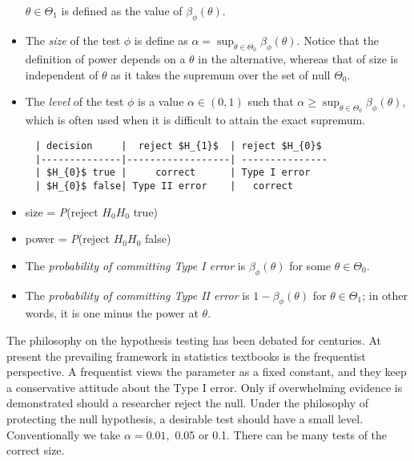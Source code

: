 \documentclass[11pt]{article}
\providecommand{\tightlist}{%
      \setlength{\itemsep}{0pt}\setlength{\parskip}{0pt}}
\begin{document}
\begin{itemize}
  \(\theta\in\Theta_{1}\) is defined as the value of
  \(\beta_{\phi}\left(\theta\right)\).
\item
  The \emph{size} of the test \(\phi\) is define as
  \(\alpha=\sup_{\theta\in\Theta_{0}}\beta_{\phi}\left(\theta\right).\)
  Notice that the definition of power depends on a \(\theta\) in the
  alternative, whereas that of size is independent of \(\theta\) as it
  takes the supremum over the set of null \(\Theta_0\).
\item
  The \emph{level} of the test \(\phi\) is a value
  \(\alpha\in\left(0,1\right)\) such that
  \(\alpha\geq\sup_{\theta\in\Theta_{0}}\beta_{\phi}\left(\theta\right)\),
  which is often used when it is difficult to attain the exact supremum.
\end{itemize}

    \begin{verbatim}
     | decision     |  reject $H_{1}$  | reject $H_{0}$
     |--------------|------------------| ---------------
     | $H_{0}$ true |     correct      | Type I error
     | $H_{0}$ false| Type II error    |   correct
\end{verbatim}

    \begin{itemize}
\tightlist
\item
  size = \emph{P}(reject \(H_{0}\)\textbar{}\(H_{0}\) true)
\item
  power = \emph{P}(reject \(H_{0}\)\textbar{}\(H_{0}\) false)
\item
  The \emph{probability of committing Type I error} is
  \(\beta_{\phi}\left(\theta\right)\) for some \(\theta\in\Theta_{0}\).
\item
  The \emph{probability of committing Type II error} is
  \(1-\beta_{\phi}\left(\theta\right)\) for \(\theta\in\Theta_{1}\); in
  other words, it is one minus the power at \(\theta\).
\end{itemize}

    The philosophy on the hypothesis testing has been debated for centuries.
At present the prevailing framework in statistics textbooks is the
frequentist perspective. A frequentist views the parameter as a fixed
constant, and they keep a conservative attitude about the Type I error.
Only if overwhelming evidence is demonstrated should a researcher reject
the null. Under the philosophy of protecting the null hypothesis, a
desirable test should have a small level. Conventionally we take
\(\alpha=0.01,\) 0.05 or 0.1. There can be many tests of the correct
size.
\end{document}
